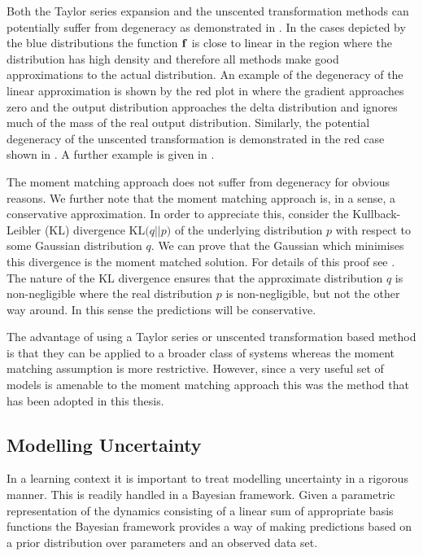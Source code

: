 %
Both the Taylor series expansion and the unscented transformation methods can potentially suffer from degeneracy as demonstrated in . In the cases depicted by the blue distributions the function $\mathbf{f}$ is close to linear in the region where the distribution has high density and therefore all methods make good approximations to the actual distribution. An example of the degeneracy of the linear approximation is shown by the red plot in  where the gradient approaches zero and the output distribution approaches the delta distribution and ignores much of the mass of the real output distribution. Similarly, the potential degeneracy of the unscented transformation is demonstrated in the red case shown in . A further example is given in \cite{DTHH12}. 

The moment matching approach does not suffer from degeneracy for obvious reasons. We further note that the moment matching approach is, in a sense, a conservative approximation. In order to appreciate this, consider the 
Kullback-Leibler (KL) divergence $\mathrm{KL}\big(q || p\big)$ of the underlying distribution $p$ with respect to some Gaussian distribution $q$. We can prove that the Gaussian which minimises this divergence is the moment matched solution. For details of this proof see . 
%
The nature of the KL divergence ensures that the approximate distribution $q$ is non-negligible where the real distribution $p$ is non-negligible, but not the other way around. In this sense the predictions will be conservative.

The advantage of using a Taylor series or unscented transformation based method is that they can be applied to a broader class of systems whereas the moment matching assumption is more restrictive. However, since a very useful set of models is amenable to the moment matching approach this was the method that has been adopted in this thesis.



\subsection{Modelling Uncertainty}
In a learning context it is important to treat modelling uncertainty in a rigorous manner. This is readily handled in a Bayesian framework. Given a parametric representation of the dynamics consisting of a linear sum of appropriate basis functions the Bayesian framework provides a way of making predictions based on a prior distribution over parameters and an observed data set.


